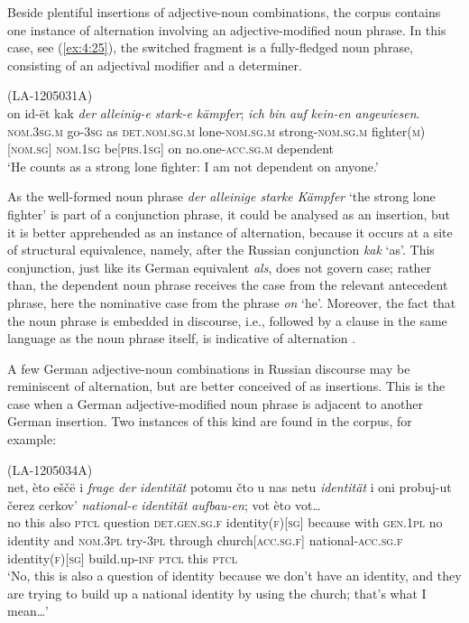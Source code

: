 Beside plentiful insertions of adjective-noun combinations, the corpus contains one instance of alternation involving an adjective-modified noun phrase. In this case, see (\ref{ex:4:25}), the switched fragment is a fully-fledged noun phrase, consisting of an adjectival modifier and a determiner.

\ea
\label{ex:4:25}
(LA-1205031A)\\
 \gll on id-ët kak \textit{der} \textit{alleinig-e} \textit{stark-e} \textit{kämpfer}; \textit{ich} \textit{bin} \textit{auf} \textit{kein-en} \textit{angewiesen}.\\
 \textsc{nom.3sg.m} go-\textsc{3sg} as \textsc{det.nom.sg.m} lone-\textsc{nom.sg.m} strong-\textsc{nom.sg.m} fighter(\textsc{m})[\textsc{nom.sg}] \textsc{nom.1sg} be[\textsc{prs.1sg}] on no.one-\textsc{acc.sg.m} dependent\\
\glt `He counts as a strong lone fighter: I am not dependent on anyone.'
\z

\noindent As the well-formed noun phrase \textit{der alleinige starke Kämpfer} `the strong lone fighter' is part of a conjunction phrase, it could be analysed as an insertion, but it is better apprehended as an instance of alternation, because it occurs at a site of structural equivalence, namely, after the Russian conjunction \textit{kak} `as'. This conjunction, just like its German equivalent \textit{als}, does not govern case; rather than, the dependent noun phrase receives the case from the relevant antecedent phrase, here the nominative case from the phrase \textit{on} `he'. Moreover, the fact that the noun phrase is embedded in discourse, i.e.,  followed by a clause in the same language as the noun phrase itself, is indicative of alternation \citep[cf.][104]{muysken-bilingual-2000}.

A few German adjective-noun combinations in Russian discourse may be reminiscent of alternation, but are better conceived of as insertions. This is the case when a German adjective-modified noun phrase is adjacent to another German insertion. Two instances of this kind are found in the corpus, for example:

\ea
\label{ex:4:26}
(LA-1205034A)\\
 \gll net, èto eščë i \textit{frage} \textit{der} \textit{identität}  potomu čto u nas netu \textit{identität}  i oni probuj-ut čerez cerkov' \textit{national-e} \textit{identität} \textit{aufbau-en}; vot èto vot\dots\\
 no this also \textsc{ptcl} question \textsc{det.gen.sg.f} identity(\textsc{f})[\textsc{sg}]  because {} with \textsc{gen.1pl} no identity and \textsc{nom.3pl} try-\textsc{3pl} through church\textsc{[acc.sg.f]} national-\textsc{acc.sg.f} identity(\textsc{f})[\textsc{sg}] build.up-\textsc{inf} \textsc{ptcl} this \textsc{ptcl}\\
\glt `No, this is also a question of identity because we don't have an identity, and they are trying to build up a national identity by using the church; that's what I mean\dots'
\z

